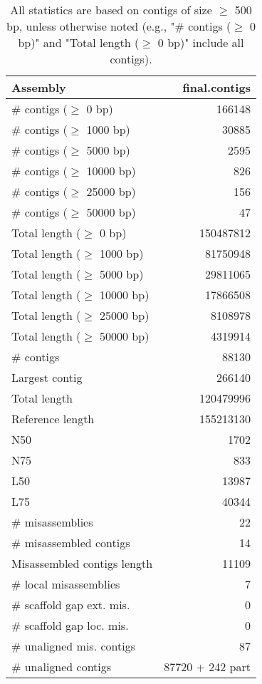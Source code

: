\documentclass[12pt,a4paper]{article}
\begin{document}
\begin{table}[ht]
\begin{center}
\caption{All statistics are based on contigs of size $\geq$ 500 bp, unless otherwise noted (e.g., "\# contigs ($\geq$ 0 bp)" and "Total length ($\geq$ 0 bp)" include all contigs).}
\begin{tabular}{|l*{1}{|r}|}
\hline
Assembly & final.contigs \\ \hline
\# contigs ($\geq$ 0 bp) & 166148 \\ \hline
\# contigs ($\geq$ 1000 bp) & 30885 \\ \hline
\# contigs ($\geq$ 5000 bp) & 2595 \\ \hline
\# contigs ($\geq$ 10000 bp) & 826 \\ \hline
\# contigs ($\geq$ 25000 bp) & 156 \\ \hline
\# contigs ($\geq$ 50000 bp) & 47 \\ \hline
Total length ($\geq$ 0 bp) & 150487812 \\ \hline
Total length ($\geq$ 1000 bp) & 81750948 \\ \hline
Total length ($\geq$ 5000 bp) & 29811065 \\ \hline
Total length ($\geq$ 10000 bp) & 17866508 \\ \hline
Total length ($\geq$ 25000 bp) & 8108978 \\ \hline
Total length ($\geq$ 50000 bp) & 4319914 \\ \hline
\# contigs & 88130 \\ \hline
Largest contig & 266140 \\ \hline
Total length & 120479996 \\ \hline
Reference length & 155213130 \\ \hline
N50 & 1702 \\ \hline
N75 & 833 \\ \hline
L50 & 13987 \\ \hline
L75 & 40344 \\ \hline
\# misassemblies & 22 \\ \hline
\# misassembled contigs & 14 \\ \hline
Misassembled contigs length & 11109 \\ \hline
\# local misassemblies & 7 \\ \hline
\# scaffold gap ext. mis. & 0 \\ \hline
\# scaffold gap loc. mis. & 0 \\ \hline
\# unaligned mis. contigs & 87 \\ \hline
\# unaligned contigs & 87720 + 242 part \\ \hline

\end{tabular}
\end{center}
\end{table}
\end{document}
